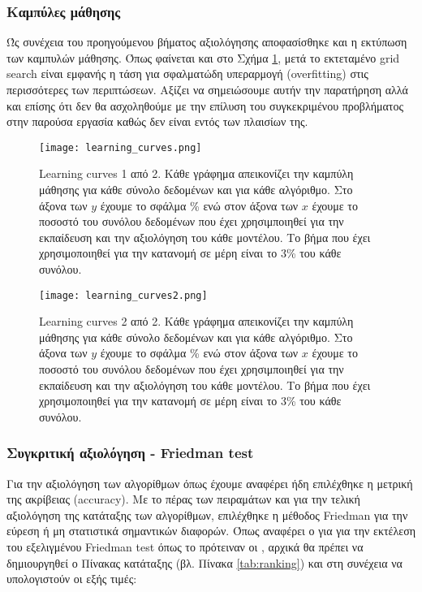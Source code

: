\subsubsection{Καμπύλες μάθησης}

Ώς συνέχεια του προηγούμενου βήματος αξιολόγησης αποφασίσθηκε και η εκτύπωση των καμπυλών μάθησης. Όπως φαίνεται και στο Σχήμα \ref{fig:learning_curves}, μετά το εκτεταμένο grid search είναι εμφανής η τάση για σφαλματώδη υπεραρμογή (overfitting) στις περισσότερες των περιπτώσεων. Αξίζει να σημειώσουμε αυτήν την παρατήρηση αλλά και επίσης ότι δεν θα ασχοληθούμε με την επίλυση του συγκεκριμένου προβλήματος στην παρούσα εργασία καθώς δεν είναι εντός των πλαισίων της.

\begin{figure}
	\centering %
	\texttt{[image: learning\_curves.png]}
	\caption{Learning curves 1 από 2. Κάθε γράφημα απεικονίζει την καμπύλη μάθησης για κάθε σύνολο δεδομένων και για κάθε αλγόριθμο. Στο άξονα των $y$ έχουμε το σφάλμα \% ενώ στον άξονα των $x$ έχουμε το ποσοστό του συνόλου δεδομένων που έχει χρησιμποιηθεί για την εκπαίδευση και την αξιολόγηση του κάθε μοντέλου. Το βήμα που έχει χρησιμοποιηθεί για την κατανομή σε μέρη είναι το 3\% του κάθε συνόλου.}
	\label{fig:learning_curves}
\end{figure}

\begin{figure}
	\centering %
	\texttt{[image: learning\_curves2.png]}
	\caption{Learning curves 2 από 2. Κάθε γράφημα απεικονίζει την καμπύλη μάθησης για κάθε σύνολο δεδομένων και για κάθε αλγόριθμο. Στο άξονα των $y$ έχουμε το σφάλμα \% ενώ στον άξονα των $x$ έχουμε το ποσοστό του συνόλου δεδομένων που έχει χρησιμποιηθεί για την εκπαίδευση και την αξιολόγηση του κάθε μοντέλου. Το βήμα που έχει χρησιμοποιηθεί για την κατανομή σε μέρη είναι το 3\% του κάθε συνόλου.}
	\label{fig:learning_curves2}
\end{figure}


\subsubsection{Συγκριτική αξιολόγηση -  Friedman test}

Για την αξιολόγηση των αλγορίθμων όπως έχουμε αναφέρει ήδη επιλέχθηκε η μετρική της ακρίβειας (accuracy).
 Με το πέρας των πειραμάτων και για την τελική αξιολόγηση της κατάταξης των αλγορίθμων, 
 επιλέχθηκε η μέθοδος Friedman για την εύρεση ή μη στατιστικά σημαντικών διαφορών. 
 Όπως αναφέρει ο \cite{demvsar} για για την εκτέλεση του εξελιγμένου Friedman test όπως 
 το πρότειναν οι \cite{iman1980}, αρχικά θα πρέπει να δημιουργηθεί 
 ο Πίνακας κατάταξης (βλ. Πίνακα \ref{tab:ranking}) και στη συνέχεια να υπολογιστούν οι εξής τιμές:

